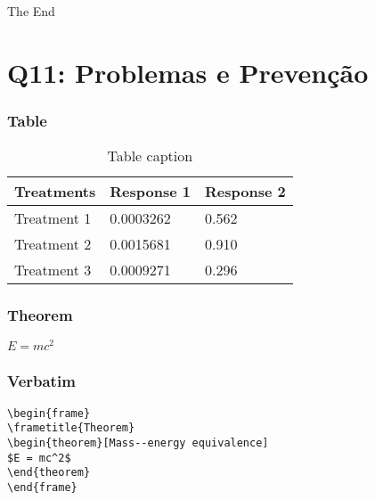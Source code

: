 \documentclass{beamer}
\begin{document}

\begin{frame}
\Huge{\centerline{The End}}
\end{frame}


\section{Q11: Problemas e Prevenção}

\begin{frame}
\frametitle{Table}
\begin{table}
\begin{tabular}{l l l}
\toprule
\textbf{Treatments} & \textbf{Response 1} & \textbf{Response 2}\\
\midrule
Treatment 1 & 0.0003262 & 0.562 \\
Treatment 2 & 0.0015681 & 0.910 \\
Treatment 3 & 0.0009271 & 0.296 \\
\bottomrule
\end{tabular}
\caption{Table caption}
\end{table}
\end{frame}


\begin{frame}
\frametitle{Theorem}
\begin{theorem}
$E = mc^2$
\end{theorem}
\end{frame}


\begin{frame}[fragile] %
\frametitle{Verbatim}
\begin{example}
\begin{verbatim}
\begin{frame}
\frametitle{Theorem}
\begin{theorem}[Mass--energy equivalence]
$E = mc^2$
\end{theorem}
\end{frame}\end{verbatim}
\end{example}
\end{frame}
\end{document}
